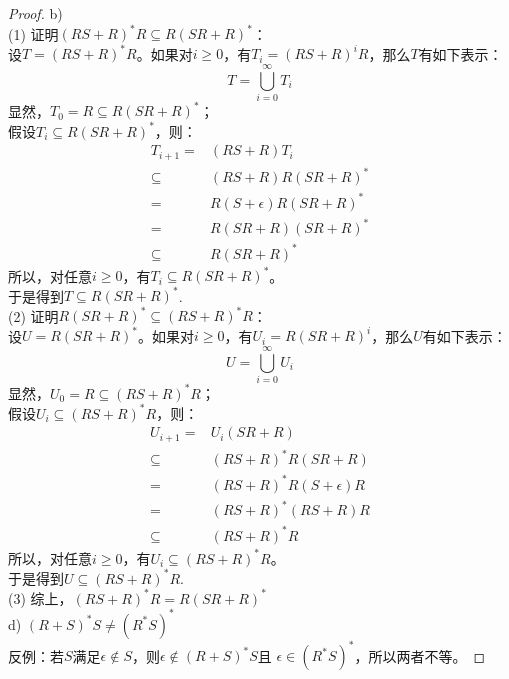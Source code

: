 \begin{proof}
    b) \\
    (1) 证明$(RS+R)^*R \subseteq R(SR+R)^*$：\\
    设$T = (RS+R)^*R$。如果对$i \ge 0$，有$T_i = (RS+R)^iR$，那么$T$有如下表示：
    $$T = \bigcup_{i=0}^{\infty} T_i$$
    显然，$T_0 = R \subseteq R(SR+R)^*$；\\
    假设$T_i \subseteq R(SR+R)^*$，则：
    \begin{align*}
        T_{i+1} =& (RS+R)T_i \\
        \subseteq& (RS+R)R(SR+R)^* \\
        =& R(S+\epsilon)R(SR+R)^* \\
        =& R(SR+R)(SR+R)^* \\
        \subseteq& R(SR+R)^*
    \end{align*}
    所以，对任意$i \ge 0$，有$T_i \subseteq R(SR+R)^*$。\\
    于是得到$T \subseteq R(SR+R)^*$.\\
    \medskip
    (2) 证明$R(SR+R)^* \subseteq (RS+R)^*R$：\\
    设$U = R(SR+R)^*$。如果对$i \ge 0$，有$U_i = R(SR+R)^i$，那么$U$有如下表示：
    $$U = \bigcup_{i=0}^{\infty} U_i$$
    显然，$U_0 = R \subseteq (RS+R)^*R$；\\
    假设$U_i \subseteq (RS+R)^*R$，则：
    \begin{align*}
        U_{i+1} =& U_i(SR+R) \\
        \subseteq& (RS+R)^*R(SR+R) \\
        =& (RS+R)^*R(S+\epsilon)R \\
        =& (RS+R)^*(RS+R)R \\
        \subseteq& (RS+R)^*R
    \end{align*}
    所以，对任意$i \ge 0$，有$U_i \subseteq (RS+R)^*R$。\\
    于是得到$U \subseteq (RS+R)^*R$.\\
    \medskip
    (3) 综上，$(RS+R)^*R = R(SR+R)^*$\\
    \bigskip
    d) $(R+S)^*S \neq (R^*S)^*$\\
    反例：若$S$满足$\epsilon \notin S$，则$\epsilon \notin (R+S)^*S$且
    $\epsilon \in (R^*S)^*$，所以两者不等。
\end{proof}
